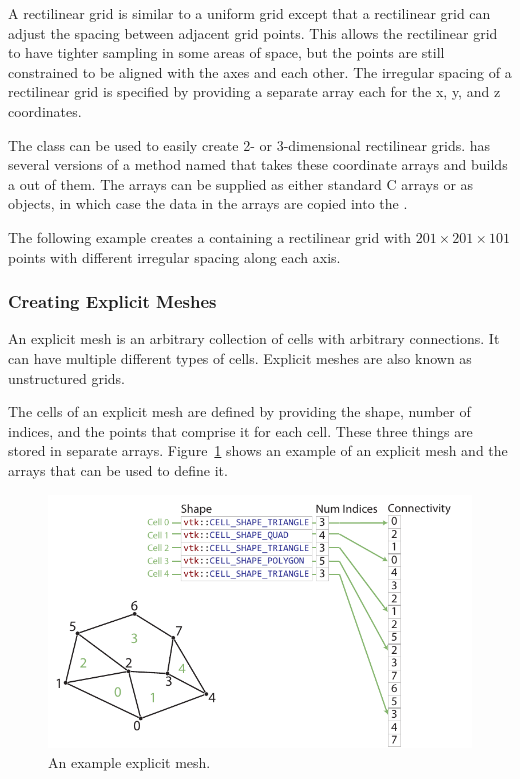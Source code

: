 
A rectilinear grid is similar to a uniform grid except that a rectilinear
grid can adjust the spacing between adjacent grid points. This allows the
rectilinear grid to have tighter sampling in some areas of space, but the
points are still constrained to be aligned with the axes and each other. The
irregular spacing of a rectilinear grid is specified by providing a
separate array each for the x, y, and z coordinates.

The  class can be used to easily create
2- or 3-dimensional rectilinear grids.
 has several versions of a method
named  that takes these coordinate arrays and builds a
 out of them. The arrays can be supplied as either
standard C arrays or as  objects, in which case the
data in the arrays are copied into the .

The following example creates a  containing a rectilinear
grid with $201 \times 201 \times 101$ points with different irregular
spacing along each axis.


\subsubsection{Creating Explicit Meshes}


An explicit mesh is an arbitrary collection of cells with arbitrary
connections. It can have multiple different types of cells. Explicit meshes
are also known as unstructured grids.

The cells of an explicit mesh are defined by providing the shape, number of
indices, and the points that comprise it for each cell. These three things
are stored in separate arrays. Figure~\ref{fig:ExplicitMesh} shows an
example of an explicit mesh and the arrays that can be used to define it.

\begin{figure}
  \centering
  \includegraphics{images/ExplicitCellConnections}
  \caption{An example explicit mesh.}
  \label{fig:ExplicitMesh}
\end{figure}

